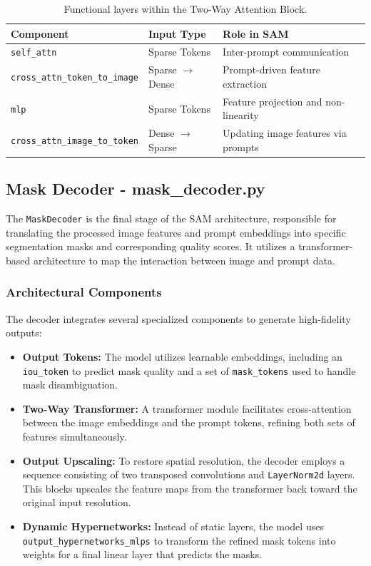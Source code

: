 \begin{table}[h]
	\centering
	\begin{tabular}{|l|l|p{5cm}|}
		\hline
		\textbf{Component} & \textbf{Input Type} & \textbf{Role in SAM} \\ \hline
		\texttt{self\_attn} & Sparse Tokens & Inter-prompt communication \\ \hline
		\texttt{cross\_attn\_token\_to\_image} & Sparse $\to$ Dense & Prompt-driven feature extraction \\ \hline
		\texttt{mlp} & Sparse Tokens & Feature projection and non-linearity \\ \hline
		\texttt{cross\_attn\_image\_to\_token} & Dense $\to$ Sparse & Updating image features via prompts \\ \hline
	\end{tabular}
	\caption{Functional layers within the Two-Way Attention Block.}
\end{table}

\subsection{Mask Decoder - mask\_decoder.py}
The \texttt{MaskDecoder} is the final stage of the SAM architecture, responsible for translating the processed image features and prompt embeddings into specific segmentation masks and corresponding quality scores. It utilizes a transformer-based architecture to map the interaction between image and prompt data.

\subsubsection{Architectural Components}
The decoder integrates several specialized components to generate high-fidelity outputs:
\begin{itemize}
	\item \textbf{Output Tokens:} The model utilizes learnable embeddings, including an \texttt{iou\_token} to predict mask quality and a set of \texttt{mask\_tokens} used to handle mask disambiguation.
	\item \textbf{Two-Way Transformer:} A transformer module facilitates cross-attention between the image embeddings and the prompt tokens, refining both sets of features simultaneously.
	\item \textbf{Output Upscaling:} To restore spatial resolution, the decoder employs a sequence consisting of two transposed convolutions and \texttt{LayerNorm2d} layers. This blocks upscales the feature maps from the transformer back toward the original input resolution.
	\item \textbf{Dynamic Hypernetworks:} Instead of static layers, the model uses \texttt{output\_hypernetworks\_mlps} to transform the refined mask tokens into weights for a final linear layer that predicts the masks.
\end{itemize}


